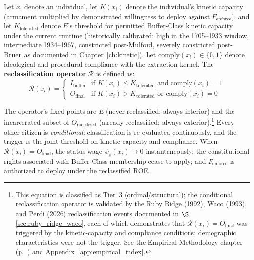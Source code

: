 Let $x_i$ denote an individual, let $K(x_i)$ denote the individual's kinetic capacity (armament multiplied by demonstrated willingness to deploy against $F_{\text{enforce}}$), and let $K_{\text{tolerated}}$ denote $E$'s threshold for permitted Buffer-Class kinetic capacity under the current runtime (historically calibrated: high in the 1705--1933 window, intermediate 1934--1967, constricted post-Mulford, severely constricted post-Bruen as documented in Chapter~\ref{ch:kinetic}). Let $\mathrm{comply}(x_i)\in\{0,1\}$ denote ideological and procedural compliance with the extraction kernel. The \textbf{reclassification operator} $\mathcal{R}$ is defined as:
\begin{equation}\label{eq:10.13-reclassification-operator}
\mathcal{R}(x_i) = \begin{cases} I_{\text{buffer}} & \text{if } K(x_i) \leq K_{\text{tolerated}} \text{ and } \mathrm{comply}(x_i) = 1 \\ O_{\text{final}} & \text{if } K(x_i) > K_{\text{tolerated}} \text{ or } \mathrm{comply}(x_i) = 0 \end{cases}
\end{equation}

The operator's fixed points are $E$ (never reclassified; always interior) and the incarcerated subset of $O_{\text{racialized}}$ (already reclassified; always exterior).\footnote{This equation is classified as Tier~3 (ordinal/structural); the conditional reclassification operator is validated by the Ruby Ridge (1992), Waco (1993), and Perdi (2026) reclassification events documented in $\S$\ref{sec:ruby_ridge_waco}, each of which demonstrates that $\mathcal{R}(x_i) = O_{\text{final}}$ was triggered by the kinetic-capacity and compliance conditions; demographic characteristics were not the trigger. See the Empirical Methodology chapter (p.~\pageref{ch:empirical_methodology}) and Appendix~\ref{app:empirical_index}.} Every other citizen is \textit{conditional}: classification is re-evaluated continuously, and the trigger is the joint threshold on kinetic capacity and compliance. When $\mathcal{R}(x_i) = O_{\text{final}}$, the status wage $\psi_s(x_i) \to 0$ instantaneously; the constitutional rights associated with Buffer-Class membership cease to apply; and $F_{\text{enforce}}$ is authorized to deploy under the reclassified ROE.

